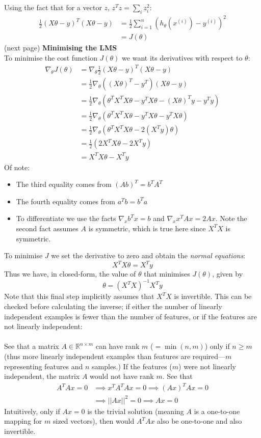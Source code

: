 \documentclass{report}
\begin{document}
Using the fact that for a vector $z$, 
$z^Tz=\sum_iz^2_i$:
\begin{align*}
\frac{1}{2}(X\theta-y)^T(X\theta-y)&=
\frac{1}{2}\sum^n_{i=1}(h_\theta(x^{(i)})-y^{(i)})^2\\
&=J(\theta)
\end{align*}
(next page)\newpage
\noindent\textbf{Minimising the LMS}\\
To minimise the cost function $J(\theta)$ we want its derivatives with respect to $\theta$:
\begin{align*}
\nabla_\theta J(\theta)&=\nabla_\theta\frac{1}{2}(X\theta-y)^T(X\theta-y)\\
&=\frac{1}{2}\nabla_\theta\left((X\theta)^T-y^T\right)(X\theta-y)\\
&=\frac{1}{2}\nabla_\theta(\theta^TX^TX\theta
-y^TX\theta-(X\theta)^Ty-y^Ty)\\
&=\frac{1}{2}\nabla_\theta(\theta^TX^TX\theta
-y^TX\theta-y^TX\theta)\\
&=\frac{1}{2}\nabla_\theta(\theta^TX^TX\theta-2(X^Ty)\theta)\\
&=\frac{1}{2}(2X^TX\theta-2X^Ty)\\
&=X^TX\theta-X^Ty
\end{align*}
Of note:
\begin{itemize}
\item The third equality comes from $(Ab)^T=b^TA^T$
\item The fourth equality comes from $a^Tb=b^Ta$
\item To differentiate we use the facts $\nabla_xb^Tx=b$ and $\nabla_xx^TAx=2Ax$. 
Note the second fact assumes $A$ is symmetric, which is true here since $X^TX$ is symmetric.
\end{itemize}
To minimise $J$ we set the derivative to zero and obtain the \textit{normal equations}:
\begin{equation*}
X^TX\theta=X^Ty
\end{equation*}
Thus we have, in closed-form, the value of $\theta$ that minimises $J(\theta)$, given by
\begin{equation*}
\theta=(X^TX)^{-1}X^Ty
\end{equation*}
Note that this final step implicitly assumes that $X^TX$ is invertible. This can be checked before calculating
the inverse; if either the number of linearly independent examples is fewer than the number of
features, or if the features are not linearly independent:\\\vspace{1mm}\\
See that a matrix $A\in\mathbb{R}^{n\times m}$ can have rank $m$ ($=\min(n,m)$) only if $n\geq m$ 
(thus more linearly independent examples than features are required---$m$ representing features and $n$ samples.) 
If the features ($m$) were not linearly independent, the matrix $A$ would not have rank $m$. See that
\begin{align*}
A^TAx=0&\implies x^TA^TAx=0\implies(Ax)^TAx=0\\&\implies||Ax||^2=0\implies Ax=0
\end{align*}
Intuitively, only if $Ax=0$ is the trivial solution (meaning $A$ is a one-to-one mapping for $m$ sized vectors), 
then would $A^TAx$ also be one-to-one and also invertible.
\newpage
\end{document}
